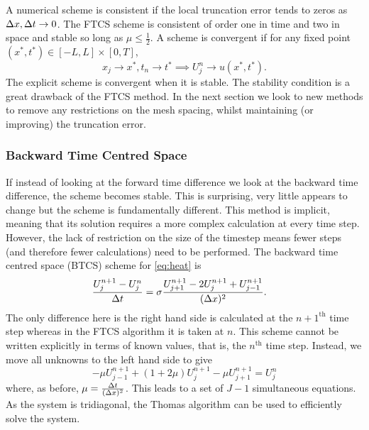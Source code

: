 A numerical scheme is consistent if the local truncation error tends to zeros as \(\Delta x, \Delta t \to 0\). The FTCS scheme is consistent of order one in time and two in space and stable so long as \(\mu \leq \frac{1}{2}\).  A scheme is convergent if for any fixed point  \((x^*,t^*) \in [-L,L] \times [0,T]\), \[x_j \to x^*, t_n \to t^* \implies U^n_j \to u(x^*,t^*).\]
The explicit scheme is convergent when it is stable. The stability condition is a great drawback of the FTCS method. In the next section we look to new methods to remove any restrictions on the mesh spacing, whilst maintaining (or improving) the truncation error.

\subsubsection*{Backward Time Centred Space}
If instead of looking at the forward time difference we look at the backward time difference, the scheme becomes stable. This is surprising, very little appears to change but the scheme is fundamentally different. This method is implicit, meaning that its solution requires a more complex calculation at every time step. However, the lack of restriction on the size of the timestep means fewer steps (and therefore fewer calculations) need to be performed. The backward time centred space (BTCS) scheme for \eqref{eq:heat} is
\begin{align}
\frac{U^{n+1}_j- U^n_j}{\Delta t} &= \sigma \frac{U^{n+1}_{j+1} - 2U^{n+1}_{j} + U^{n+1}_{j-1}}{(\Delta x)^2}.
\end{align}
The only difference here is the right hand side is calculated at the $n+1^{\text{th}}$ time step whereas in the FTCS algorithm it is taken at $n$. This scheme cannot be written explicitly in terms of known values, that is, the $n^{\text{th}}$ time step. Instead, we move all unknowns to the left hand side to give
\[
-\mu U^{n+1}_{j-1} + (1+2\mu)U^{n+1}_j - \mu U^{n+1}_{j+1} = U^n_j
\]
where, as before, $\mu=\frac{\Delta t}{(\Delta x)^2}$. This leads to a set of $J-1$ simultaneous equations. As the system is tridiagonal, the Thomas algorithm can be used to efficiently solve the system.

